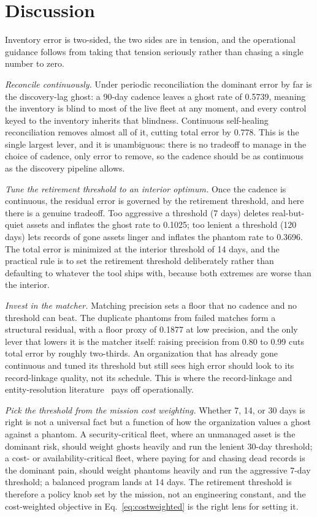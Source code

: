 \documentclass[journal]{IEEEtran}
\begin{document}
\section{Discussion}
Inventory error is two-sided, the two sides are in tension, and the operational guidance follows from
taking that tension seriously rather than chasing a single number to zero.

\emph{Reconcile continuously.} Under periodic reconciliation the dominant error by far is the
discovery-lag ghost: a 90-day cadence leaves a ghost rate of 0.5739, meaning the inventory is blind
to most of the live fleet at any moment, and every control keyed to the inventory inherits that
blindness. Continuous self-healing reconciliation removes almost all of it, cutting total error by
0.778. This is the single largest lever, and it is unambiguous: there is no tradeoff to manage in the
choice of cadence, only error to remove, so the cadence should be as continuous as the discovery
pipeline allows.

\emph{Tune the retirement threshold to an interior optimum.} Once the cadence is continuous, the
residual error is governed by the retirement threshold, and here there is a genuine tradeoff. Too
aggressive a threshold (7 days) deletes real-but-quiet assets and inflates the ghost rate to 0.1025;
too lenient a threshold (120 days) lets records of gone assets linger and inflates the phantom rate
to 0.3696. The total error is minimized at the interior threshold of 14 days, and the practical rule
is to set the retirement threshold deliberately rather than defaulting to whatever the tool ships
with, because both extremes are worse than the interior.

\emph{Invest in the matcher.} Matching precision sets a floor that no cadence and no threshold can
beat. The duplicate phantoms from failed matches form a structural residual, with a floor proxy of
0.1877 at low precision, and the only lever that lowers it is the matcher itself: raising precision
from 0.80 to 0.99 cuts total error by roughly two-thirds. An organization that has already gone
continuous and tuned its threshold but still sees high error should look to its record-linkage
quality, not its schedule. This is where the record-linkage and entity-resolution
literature~\cite{fellegi1969linkage,christen2012matching} pays off operationally.

\emph{Pick the threshold from the mission cost weighting.} Whether 7, 14, or 30 days is right is not
a universal fact but a function of how the organization values a ghost against a phantom. A
security-critical fleet, where an unmanaged asset is the dominant risk, should weight ghosts heavily
and run the lenient 30-day threshold; a cost- or availability-critical fleet, where paying for and
chasing dead records is the dominant pain, should weight phantoms heavily and run the aggressive
7-day threshold; a balanced program lands at 14 days. The retirement threshold is therefore a policy
knob set by the mission, not an engineering constant, and the cost-weighted objective in
Eq.~\eqref{eq:costweighted} is the right lens for setting it.
\end{document}
